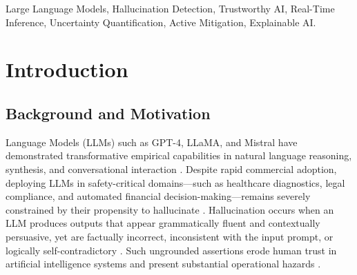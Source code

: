 \documentclass[journal]{IEEEtran}
\begin{document}
\begin{IEEEkeywords}
Large Language Models, Hallucination Detection, Trustworthy AI, Real-Time Inference, Uncertainty Quantification, Active Mitigation, Explainable AI.
\end{IEEEkeywords}

\section{Introduction}

\subsection{Background and Motivation}
 Language Models (LLMs) such as GPT-4, LLaMA, and Mistral have demonstrated transformative empirical capabilities in natural language reasoning, synthesis, and conversational interaction \cite{huang2024trustllm, zhang2025siren}. Despite rapid commercial adoption, deploying LLMs in safety-critical domains---such as healthcare diagnostics, legal compliance, and automated financial decision-making---remains severely constrained by their propensity to hallucinate \cite{ji2023survey, bang2023multitask}. Hallucination occurs when an LLM produces outputs that appear grammatically fluent and contextually persuasive, yet are factually incorrect, inconsistent with the input prompt, or logically self-contradictory \cite{min2023factscore, mundler2023self}. Such ungrounded assertions erode human trust in artificial intelligence systems and present substantial operational hazards \cite{sharma2024trust, herrera2025xai}.
\end{document}
